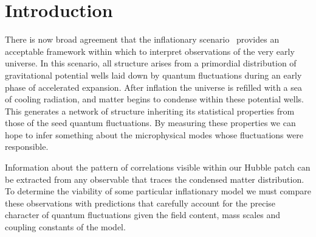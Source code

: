 \documentclass[11pt,a4paper]{article}
\begin{document}
\maketitle
\newpage

\section{Introduction}
There is now broad agreement that the inflationary
scenario~\cite{Guth:1980zm,Starobinsky:1980te,Albrecht:1982wi,
Hawking:1981fz,Linde:1981mu,Linde:1983gd}
provides an acceptable framework within which to interpret
observations of the very early universe.
In this scenario, all structure arises from a primordial distribution
of gravitational potential wells laid down by quantum
fluctuations during an early phase of accelerated expansion.
After inflation the universe is refilled with a sea of cooling radiation,
and matter begins to condense within these potential wells.
This generates a network of structure inheriting its statistical
properties from those of the seed quantum fluctuations.
By measuring these properties we can hope
to infer something about the microphysical modes whose fluctuations
were responsible.

Information about the pattern of correlations visible within our Hubble patch
can be extracted from any observable that traces the condensed matter
distribution.
To determine the viability of some particular inflationary model
we must compare these observations with predictions
that carefully account for the precise character of quantum
fluctuations given the field content, mass scales and coupling constants of the model.
\end{document}
